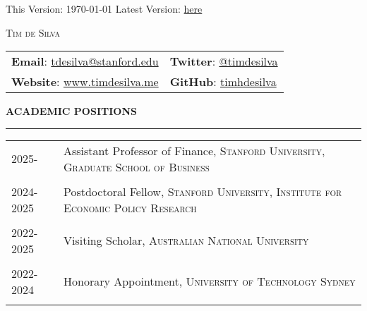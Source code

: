 \documentclass[a4paper, 10pt]{article}
\newcommand{\cvsec}[1]
{
	\needspace{2\baselineskip}
	\noindent \textbf{#1}
	
	\vspace{2pt}
	
	\hrule
	
	\bigskip
}
\newcommand{\cvitem}[2]{#1 & #2 \\ & \\}
\newenvironment{cvchrono}[1]
{
	\cvsec{#1}
	\begin{tabu} to \linewidth {X[1,l]X[6,l]} 
}
{
	\end{tabu}
}
\begin{document}
\begin{flushright}
	This Version: \today{}
	\vskip 0.01cm 
	Latest Version: \href{https://www.timdesilva.me/files/cv.pdf}{here}
\end{flushright}

\bigskip

\begin{center}
	\huge \textsc{Tim de Silva}
\end{center}

\bigskip \bigskip

\begin{tabu} to \linewidth {X[l]X[r]}
	 \textbf{Email}: \href{mailto:tdesilva@stanford.edu}{tdesilva@stanford.edu} & \textbf{Twitter}: \href{https://twitter.com/timdesilva}{@timdesilva} \\
	\textbf{Website}: \href{http://www.timdesilva.me}{www.timdesilva.me} & \textbf{GitHub}: \href{https://github.com/timhdesilva}{timhdesilva} \\
\end{tabu}

\bigskip \bigskip

\begin{cvchrono}{ACADEMIC POSITIONS}
	\cvitem{2025-}{Assistant Professor of Finance, \textsc{Stanford University, Graduate School of Business}
		}
	\cvitem{2024-2025}{Postdoctoral Fellow, \textsc{Stanford University, Institute for Economic Policy Research}
		}
	\cvitem{2022-2025}{Visiting Scholar, \textsc{Australian National University}}
	\cvitem{2022-2024}{Honorary Appointment, \textsc{University of Technology Sydney}}
\end{cvchrono}
\end{document}
